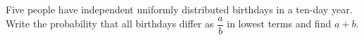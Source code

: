 Five people have independent uniformly distributed birthdays in a ten-day year. Write the probability that all birthdays differ as $\dfrac{a}{b}$ in lowest terms and find $a+b$.

